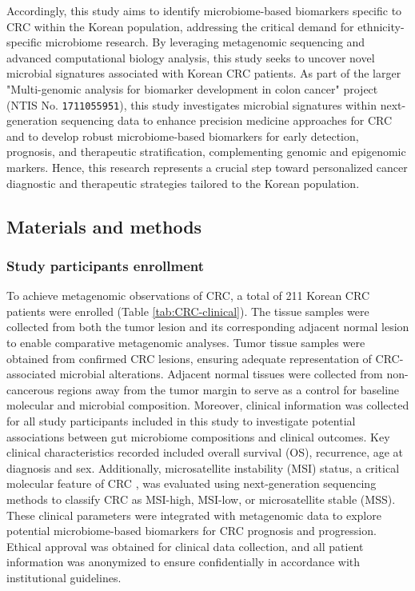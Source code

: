 \documentclass[11pt, a4paper, onecolumn, oneside]{report}
\begin{document}
            Accordingly, this study aims to identify microbiome-based biomarkers specific to CRC within the Korean population, addressing the critical demand for ethnicity-specific microbiome research. By leveraging metagenomic sequencing and advanced computational biology analysis, this study seeks to uncover novel microbial signatures associated with Korean CRC patients. As part of the larger "Multi-genomic analysis for biomarker development in colon cancer" project (NTIS No. \texttt{1711055951}), this study investigates microbial signatures within next-generation sequencing data to enhance precision medicine approaches for CRC and to develop robust microbiome-based biomarkers for early detection, prognosis, and therapeutic stratification, complementing genomic and epigenomic markers. Hence, this research represents a crucial step toward personalized cancer diagnostic and therapeutic strategies tailored to the Korean population.
        \clearpage

        \subsection{Materials and methods}
            \subsubsection{Study participants enrollment}
                To achieve metagenomic observations of CRC, a total of 211 Korean CRC patients were enrolled (Table \ref{tab:CRC-clinical}). The tissue samples were collected from both the tumor lesion and its corresponding adjacent normal lesion to enable comparative metagenomic analyses. Tumor tissue samples were obtained from confirmed CRC lesions, ensuring adequate representation of CRC-associated microbial alterations. Adjacent normal tissues were collected from non-cancerous regions away from the tumor margin to serve as a control for baseline molecular and microbial composition. Moreover, clinical information was collected for all study participants included in this study to investigate potential associations between gut microbiome compositions and clinical outcomes. Key clinical characteristics recorded included overall survival (OS), recurrence, age at diagnosis and sex. Additionally, microsatellite instability (MSI) status, a critical molecular feature of CRC \cite{CRC-MSI-1, CRC-MSI-2}, was evaluated using next-generation sequencing methods to classify CRC as MSI-high, MSI-low, or microsatellite stable (MSS). These clinical parameters were integrated with metagenomic data to explore potential microbiome-based biomarkers for CRC prognosis and progression. Ethical approval was obtained for clinical data collection, and all patient information was anonymized to ensure confidentially in accordance with institutional guidelines.
\end{document}
